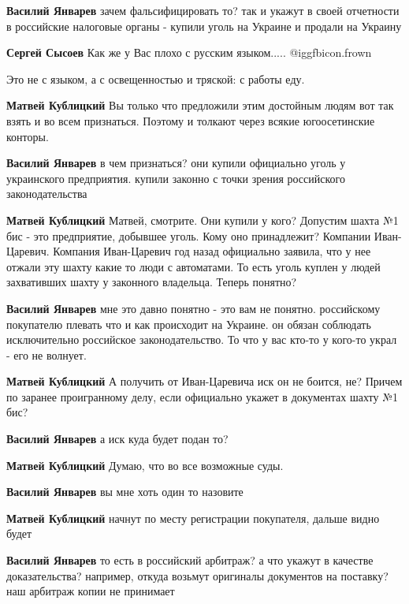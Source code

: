 \begin{itemize}
\begin{itemize}
\textbf{Василий Январев} зачем фальсифицировать то? так и укажут в своей отчетности в российские налоговые органы - купили уголь на Украине и продали на Украину

\textbf{Сергей Сысоев} Как же у Вас плохо с русским языком..... @igg{fbicon.frown} 

Это не с языком, а с освещенностью и тряской: с работы еду.

\textbf{Матвей Кублицкий} Вы только что предложили этим достойным людям вот так взять и во всем признаться. Поэтому и толкают через всякие югоосетинские конторы.

\textbf{Василий Январев} в чем признаться? они купили официально уголь у украинского предприятия. купили законно с точки зрения российского законодательства

\textbf{Матвей Кублицкий} Матвей, смотрите. Они купили у кого? Допустим шахта №1 бис - это предприятие, добывшее уголь. Кому оно принадлежит? Компании Иван-Царевич. Компания Иван-Царевич год назад официально заявила, что у нее отжали эту шахту какие то люди с автоматами. То есть уголь куплен у людей захвативших шахту у законного владельца. Теперь понятно?

\textbf{Василий Январев} мне это давно понятно - это вам не понятно. российскому покупателю плевать что и как происходит на Украине. он обязан соблюдать исключительно российское законодательство. То что у вас кто-то у кого-то украл - его не волнует.

\textbf{Матвей Кублицкий} А получить от Иван-Царевича иск он не боится, не? Причем по заранее проигранному делу, если официально укажет в документах шахту №1 бис?

\textbf{Василий Январев} а иск куда будет подан то?

\textbf{Матвей Кублицкий} Думаю, что во все возможные суды.

\textbf{Василий Январев} вы мне хоть один то назовите

\textbf{Матвей Кублицкий} начнут по месту регистрации покупателя, дальше видно будет

\textbf{Василий Январев} то есть в российский арбитраж? а что укажут в качестве доказательства? например, откуда возьмут оригиналы документов на поставку? наш арбитраж копии не принимает


\end{itemize}
\end{itemize}
